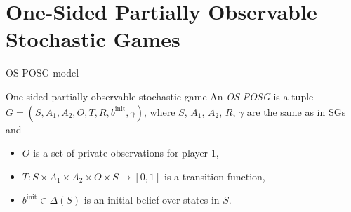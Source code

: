 \documentclass{beamer}
\newcommand\unit{0.75}
\newcommand\zero{0}
\newcommand\one{\unit}
\newcommand\two{2 * \unit}
\begin{document}
\section{One-Sided Partially Observable Stochastic Games}

\begin{frame}{OS-POSG model}
    \begin{block}{One-sided partially observable stochastic game}
        An \textit{OS-POSG} is a tuple $G = \left(S, A_1, A_2, O, T, R, b^{\text{init}}, \gamma\right)$, where $S$, $A_1$, $A_2$, $R$, $\gamma$ are the same as in SGs and
        \begin{itemize}
            \item $O$ is a set of private observations for player 1,
            \item $T: S \times A_1 \times A_2 \times O \times S \to \left[0, 1\right]$ is a transition function,
            \item $b^{\text{init}} \in \Delta(S)$ is an initial belief over states in $S$.
        \end{itemize}
    \end{block}
    \begin{columns}
        \begin{flushright}
        \end{flushright}
        \begin{flushright}
\end{flushright}
\end{columns}
\end{frame}
\end{document}
